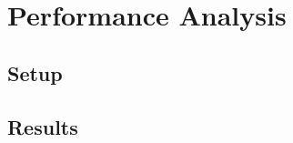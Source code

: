 
\chapter{Performance Analysis}\label{chapter:performance_analysis}

\section{Setup}

\section{Results}

